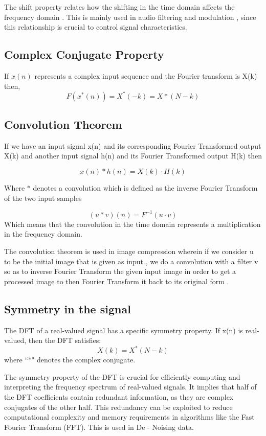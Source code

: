 \documentclass[11pt]{amsart}
\theoremstyle{definition}
\theoremstyle{remark}
\numberwithin{equation}{section}
\begin{document}
The shift property relates how the shifting in the time domain affects the frequency domain . This is mainly used in audio filtering and modulation , since this relationship is crucial to control signal characteristics. 

\subsection{Complex Conjugate Property}
If $x(n)$ represents a complex input sequence  and the Fourier transform is X(k) then, 
\[\textit{F}(x^{*}(n)) = X^{*}(-k) = X*(N-k)\]

\subsection{Convolution Theorem}
If we have an input signal x(n) and its corresponding Fourier Transformed output X(k) and another input signal h(n) and its Fourier Transformed output H(k) then

\[x(n) \ast h(n)  = X(k) \cdot H(k)\]

Where $\ast$ denotes a convolution which is defined as the inverse Fourier Transform of the two input samples 

\[(u \ast v)(n) = \textit{F}^{-1} (u \cdot v)\]
Which means that the convolution in the time domain represents a multiplication in the frequency domain.

The convolution theorem is used in image compression wherein if we consider u to be the initial image that is given as input , we do a convolution with a filter v so as to inverse Fourier Transform the given input image in order to get a processed image to then Fourier Transform it back to its original form . 

\subsection{Symmetry in the signal}
The DFT of a real-valued signal has a specific symmetry property. If x(n) is real-valued, then the DFT satisfies:
\[X(k) = X^{*}(N - k)\]
where ``*" denotes the complex conjugate.

The symmetry property of the DFT is crucial for efficiently computing and interpreting the frequency spectrum of real-valued signals. It implies that half of the DFT coefficients contain redundant information, as they are complex conjugates of the other half. This redundancy can be exploited to reduce computational complexity and memory requirements in algorithms like the Fast Fourier Transform (FFT). This is used in De - Noising data.
\end{document}

